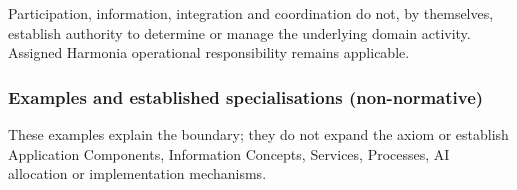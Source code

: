 Participation, information, integration and coordination do not, by themselves, establish authority to determine or manage the underlying domain activity. Assigned Harmonia operational responsibility remains applicable.

\label{rad:axioms:918}
\subsubsection*{Examples and established specialisations (non-normative)}
\label{rad:axioms:920}

These examples explain the boundary; they do not expand the axiom or establish Application Components, Information Concepts, Services, Processes, AI allocation or implementation mechanisms.

\label{rad:axioms:924}

